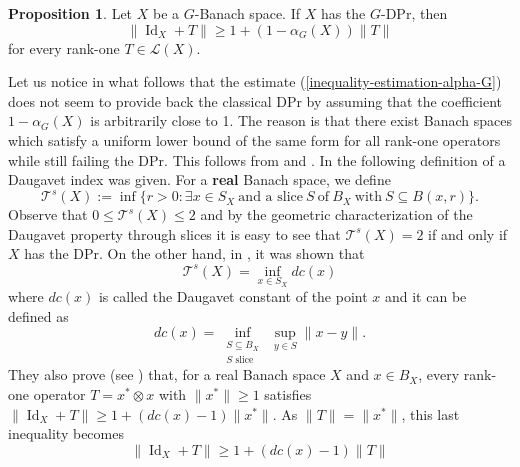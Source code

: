 \documentclass[a4paper,12pt]{amsart}
\theoremstyle{definition}
\newtheorem{proposition}[theorem]{Proposition}
\theoremstyle{definition}
\theoremstyle{remark}
\numberwithin{equation}{section}
\DeclareMathOperator{\id}{Id}
\renewcommand{\geq}{\geqslant}
\renewcommand{\leq}{\leqslant}
\newcommand{\<}{\langle}
\renewcommand{\>}{\rangle}
\begin{document}
	\begin{proposition} \label{proposition-estimation-alpha-G} Let $X$ be a $G$-Banach space. If $X$ has the $G$-DPr, then 
		\begin{equation} \label{inequality-estimation-alpha-G}
			\| \id_X + T\| \geq 1 + (1 - \alpha_G(X)) \|T\| 
		\end{equation}
		for every rank-one $T \in \mathcal{L}(X)$.
	\end{proposition}
	
	
	Let us notice in what follows that the estimate (\ref{inequality-estimation-alpha-G}) does not seem to provide back the classical DPr by assuming that the coefficient $1-\alpha_G(X)$ is arbitrarily close to 1. The reason is that there exist Banach spaces which satisfy a uniform lower bound of the same form for all rank-one operators while still failing the DPr. This follows from \cite{ChoiJung2024} and \cite{HallerLangemetsLimaNadelRuedaZoca2021}. In \cite{HallerLangemetsLimaNadelRuedaZoca2021} the following definition of a Daugavet index was given. For a {\bf real} Banach space, we define 
	\begin{equation*}
		\mathcal{T}^s(X) := \inf \{ r > 0: \exists x \in S_X \ \mbox{and a slice} \ S \ \mbox{of} \ B_X \ \mbox{with} \ S \subseteq B(x,r) \}.
	\end{equation*}
	Observe that $0 \leq \mathcal{T}^s(X) \leq 2$ and by the geometric characterization of the Daugavet property through slices it is easy to see that $\mathcal{T}^{s}(X)=2$ if and only if $X$ has the DPr. On the other hand, in \cite[Proposition 2.14]{ChoiJung2024}, it was shown that
	\begin{equation*}
		\mathcal{T}^s(X) = \inf_{x \in S_X} dc(x) 
	\end{equation*}
	where $dc(x)$ is called the Daugavet constant of the point $x$ and it can be defined as
	\begin{equation*}
		dc(x)=\inf_{\substack{S\subseteq B_X\\ S\text{ slice}}}\ \sup_{y\in S}\|x-y\|.
	\end{equation*}
	They also prove (see \cite[Proposition 2.4]{ChoiJung2024}) that, for a real Banach space $X$ and $x \in B_X$, every rank-one operator $T = x^* \otimes x$ with $\|x^*\| \geq 1$ satisfies $\| \id_X + T\| \geq 1+(dc(x) - 1)\|x^*\|$. As $\|T\| = \|x^*\|$, this last inequality becomes 
	\begin{equation} \label{choi-jung-estimate}
		\| \id_X + T\| \geq 1 + (dc(x) - 1)\|T\|
	\end{equation}
\end{document}
